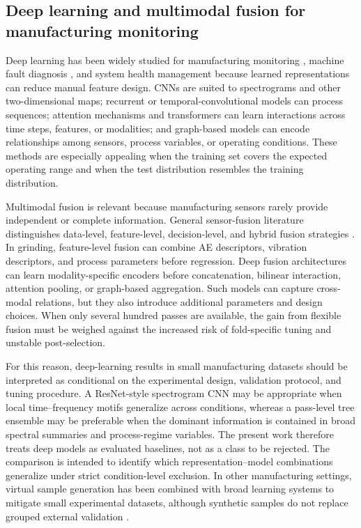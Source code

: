 \subsection{Deep learning and multimodal fusion for manufacturing monitoring}\label{rw:deep-fusion}

Deep learning has been widely studied for manufacturing monitoring \cite{Wang2018}, machine fault diagnosis \cite{Khan2018}, and system health management \cite{Lei2020} because learned representations can reduce manual feature design. CNNs are suited to spectrograms and other two-dimensional maps; recurrent or temporal-convolutional models can process sequences; attention mechanisms and transformers can learn interactions across time steps, features, or modalities; and graph-based models can encode relationships among sensors, process variables, or operating conditions. These methods are especially appealing when the training set covers the expected operating range and when the test distribution resembles the training distribution.

Multimodal fusion is relevant because manufacturing sensors rarely provide independent or complete information. General sensor-fusion literature distinguishes data-level, feature-level, decision-level, and hybrid fusion strategies \cite{Khaleghi2013}. In grinding, feature-level fusion can combine AE descriptors, vibration descriptors, and process parameters before regression. Deep fusion architectures can learn modality-specific encoders before concatenation, bilinear interaction, attention pooling, or graph-based aggregation. Such models can capture cross-modal relations, but they also introduce additional parameters and design choices. When only several hundred passes are available, the gain from flexible fusion must be weighed against the increased risk of fold-specific tuning and unstable post-selection.

For this reason, deep-learning results in small manufacturing datasets should be interpreted as conditional on the experimental design, validation protocol, and tuning procedure. A ResNet-style spectrogram CNN may be appropriate when local time--frequency motifs generalize across conditions, whereas a pass-level tree ensemble may be preferable when the dominant information is contained in broad spectral summaries and process-regime variables. The present work therefore treats deep models as evaluated baselines, not as a class to be rejected. The comparison is intended to identify which representation--model combinations generalize under strict condition-level exclusion. In other manufacturing settings, virtual sample generation has been combined with broad learning systems to mitigate small experimental datasets, although synthetic samples do not replace grouped external validation \cite{Ge2025BLSVSG}.

